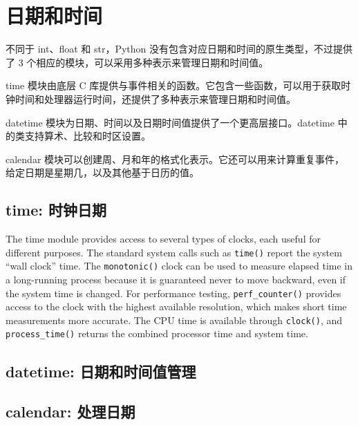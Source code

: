 \chapter{日期和时间}
不同于 int、float 和 str，Python 没有包含对应日期和时间的原生类型，不过提供了 3 个相应的模块，可以采用多种表示来管理日期和时间值。

time 模块由底层 C 库提供与事件相关的函数。它包含一些函数，可以用于获取时钟时间和处理器运行时间，还提供了多种表示来管理日期和时间值。

datetime 模块为日期、时间以及日期时间值提供了一个更高层接口。datetime 中的类支持算术、比较和时区设置。

calendar 模块可以创建周、月和年的格式化表示。它还可以用来计算重复事件，给定日期是星期几，以及其他基于日历的值。
\section{time: 时钟日期}
The time module provides access to several types of clocks, each useful for different purposes. The standard system calls such as \verb|time()| report the system “wall clock” time. The \verb|monotonic()| clock can be used to measure elapsed time in a long-running process because it is guaranteed never to move backward, even if the system time is changed. For performance testing, \verb|perf_counter()| provides access to the clock with the highest available resolution, which makes short time measurements more accurate. The CPU time is available through \verb|clock()|, and \verb|process_time()| returns the combined processor time and system time.

\section{datetime: 日期和时间值管理}
\section{calendar: 处理日期}